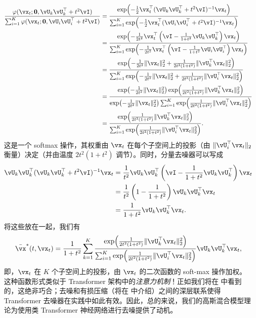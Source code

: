 \documentclass[../../book-main.tex]{subfiles}
\begin{document}
\begin{align}
	\frac{\phi(\vx_{t} ; \vzero, \vU_{k}\vU_{k}^{\top} + t^{2}\vI)}{\sum_{i
	= 1}^{K}\phi(\vx_{t} ; \vzero, \vU_{i}\vU_{i}^{\top} + t^{2}\vI)} 
	&= \frac{\exp\rp{-\frac{1}{2}\vx_{t}^{\top}(\vU_{k}\vU_{k}^{\top} + t^{2}\vI)^{-1}\vx_{t}}}{\sum_{i = 1}^{K}\exp\rp{-\frac{1}{2}\vx_{t}^{\top}(\vU_{i}\vU_{i}^{\top} + t^{2}\vI)^{-1}\vx_{t}}} \\
	&= \frac{\exp\rp{-\frac{1}{2t^{2}}\vx_{t}^{\top}\bp{\vI - \frac{1}{1 + t^{2}}\vU_{k}\vU_{k}^{\top}}\vx_{t}}}{\sum_{i = 1}^{K}\exp\rp{-\frac{1}{2t^{2}}\vx_{t}^{\top}\bp{\vI - \frac{1}{1 + t^{2}}\vU_{i}\vU_{i}^{\top}}\vx_{t}}} \\
	&= \frac{\exp\rp{-\frac{1}{2t^{2}}\norm{\vx_{t}}_{2}^{2} + \frac{1}{2t^{2}(1 + t^{2})}\norm{\vU_{k}^{\top}\vx_{t}}_{2}^{2}}}{\sum_{i = 1}^{K}\exp\rp{-\frac{1}{2t^{2}}\norm{\vx_{t}}_{2}^{2} + \frac{1}{2t^{2}(1 + t^{2})}\norm{\vU_{i}^{\top}\vx_{t}}_{2}^{2}}} \\
	&= \frac{\exp\rp{-\frac{1}{2t^{2}}\norm{\vx_{t}}_{2}^{2}}\exp\rp{\frac{1}{2t^{2}(1 + t^{2})}\norm{\vU_{k}^{\top}\vx_{t}}_{2}^{2}}}{\exp\rp{-\frac{1}{2t^{2}}\norm{\vx_{t}}_{2}^{2}}\sum_{i = 1}^{K}\exp\rp{\frac{1}{2t^{2}(1 + t^{2})}\norm{\vU_{i}^{\top}\vx_{t}}_{2}^{2}}} \\
	&= \frac{\exp\rp{\frac{1}{2t^{2}(1 + t^{2})}\norm{\vU_{k}^{\top}\vx_{t}}_{2}^{2}}}{\sum_{i = 1}^{K}\exp\rp{\frac{1}{2t^{2}(1 + t^{2})}\norm{\vU_{i}^{\top}\vx_{t}}_{2}^{2}}}.
\end{align}
这是一个 softmax 操作，其权重由 \(\vx_{t}\) 在每个子空间上的投影（由 \(\norm{\vU_{i}^{\top}\vx_{t}}_{2}\) 衡量）决定（并由温度 \(2t^{2}(1 + t^{2})\) 调节）。同时，分量去噪器可以写成
\begin{align}
	\vU_{k}\vU_{k}^{\top}(\vU_{k}\vU_{k}^{\top} + t^{2}\vI)^{-1}\vx_{t} 
	&= \frac{1}{t^{2}}\vU_{k}\vU_{k}^{\top}\bp{\vI - \frac{1}{1 + t^{2}}\vU_{k}\vU_{k}^{\top}}\vx_{t} \\
	&= \frac{1}{t^{2}}\bp{1 - \frac{1}{1 + t^{2}}}\vU_{k}\vU_{k}^{\top}\vx_{t} \\
	&= \frac{1}{1 + t^{2}}\vU_{k}\vU_{k}^{\top}\vx_{t}.
\end{align}
将这些放在一起，我们有
\begin{equation}\label{eq:gmm_lowrank_denoiser}
	\bar{\vx}^{\ast}(t, \vx_{t}) = \frac{1}{1 + t^{2}}\sum_{k = 1}^{K}\frac{\exp\rp{\frac{1}{2t^{2}(1 + t^{2})}\norm{\vU_{k}^{\top}\vx_{t}}_{2}^{2}}}{\sum_{i = 1}^{K}\exp\rp{\frac{1}{2t^{2}(1 + t^{2})}\norm{\vU_{i}^{\top}\vx_{t}}_{2}^{2}}}\vU_{k}\vU_{k}^{\top}\vx_{t},
\end{equation}
即，\(\vx_{t}\) 在 \(K\) 个子空间上的投影，由 \(\vx_{t}\) 的二次函数的 soft-max 操作加权。这种函数形式类似于 Transformer 架构中的\textit{注意力机制}！正如我们将在  中看到的，这绝非巧合；去噪和有损压缩（将在  中介绍）之间的深层联系使得 Transformer 去噪器在实践中如此有效。因此，总的来说，我们的高斯混合模型理论为使用类 Transformer 神经网络进行去噪提供了动机。
\end{document}
